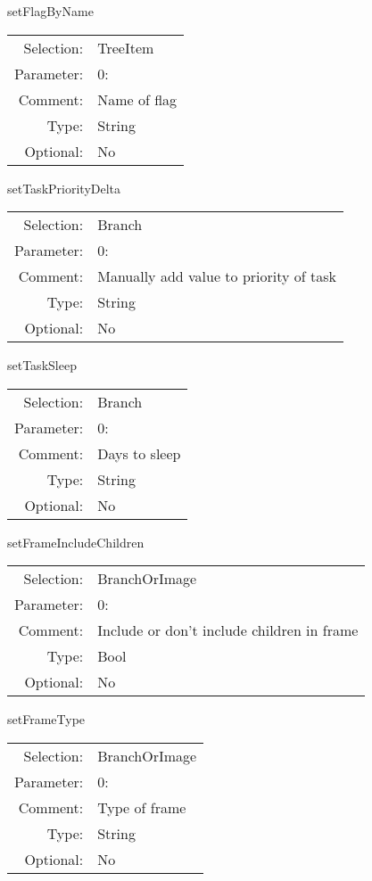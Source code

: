 \item setFlagByName\\
\begin{tabular}{rl}
  Selection: & TreeItem\\
   Parameter: &  0:\\
        Comment: & Name of flag\\
           Type: & String\\
       Optional: &  No\\
\end{tabular}

\item setTaskPriorityDelta\\
\begin{tabular}{rl}
  Selection: & Branch\\
   Parameter: &  0:\\
        Comment: & Manually add value to priority of task\\
           Type: & String\\
       Optional: &  No\\
\end{tabular}

\item setTaskSleep\\
\begin{tabular}{rl}
  Selection: & Branch\\
   Parameter: &  0:\\
        Comment: & Days to sleep\\
           Type: & String\\
       Optional: &  No\\
\end{tabular}

\item setFrameIncludeChildren\\
\begin{tabular}{rl}
  Selection: & BranchOrImage\\
   Parameter: &  0:\\
        Comment: & Include or don't include children in frame\\
           Type: & Bool\\
       Optional: &  No\\
\end{tabular}

\item setFrameType\\
\begin{tabular}{rl}
  Selection: & BranchOrImage\\
   Parameter: &  0:\\
        Comment: & Type of frame\\
           Type: & String\\
       Optional: &  No\\
\end{tabular}

